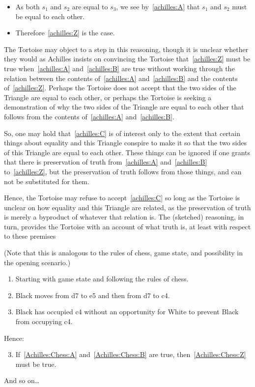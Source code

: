 \documentclass[10pt]{article}
\begin{document}
\begin{note}
{\begin{itemize}
  \item As both \(s_{1}\) and \(s_{2}\) are equal to \(s_{3}\), we see by~\ref{achilles:A} that \(s_{1}\) and \(s_{2}\) must be equal to each other.
  \item Therefore~\ref{achilles:Z} is the case.
  \end{itemize}
  The Tortoise may object to a step in this reasoning, though it is unclear whether they would as Achilles insists on convincing the Tortoise that~\ref{achilles:Z} must be true when~\ref{achilles:A} and~\ref{achilles:B} are true without working through the relation between the contents of~\ref{achilles:A} and~\ref{achilles:B} and the contents of~\ref{achilles:Z}.
  Perhaps the Tortoise does not accept that the two sides of the Triangle are equal to each other, or perhaps the Tortoise is seeking a demonstration of why the two sides of the Triangle are equal to each other that follows from the contents of~\ref{achilles:A} and~\ref{achilles:B}.

  So, one may hold that~\ref{achilles:C} is of interest only to the extent that certain things about equality and this Triangle conspire to make it so that the two sides of this Triangle are equal to each other.
  These things can be ignored if one grants that there is preservation of truth from~\ref{achilles:A} and~\ref{achilles:B} to~\ref{achilles:Z}, but the preservation of truth follows from those things, and can not be substituted for them.

  Hence, the Tortoise may refuse to accept~\ref{achilles:C} so long as the Tortoise is unclear on how equality and this Triangle are related, as the preservation of truth is merely a byproduct of whatever that relation is.
  The (sketched) reasoning, in turn, provides the Tortoise with an account of what truth is, at least with respect to these premises

  (Note that this is analogous to the rules of chess, game state, and possibility in the opening scenario.)
    {
    \color{red}
    \begin{enumerate}[label=(\emph{\Alph*\('\)}), ref=\emph{\Alph*\('\)}]
    \item\label{Achilles:Chess:A} Starting with game state and following the rules of chess.
    \item\label{Achilles:Chess:B} Black moves from d7 to e5 and then from d7 to c4.
      \setcounter{enumi}{25}
    \item\label{Achilles:Chess:Z} Black has occupied c4 without an opportunity for White to prevent Black from occupying c4.
    \end{enumerate}
    Hence:
    \begin{enumerate}[label=(\emph{\Alph*\('\)}), ref=\emph{\Alph*\('\)}]
      \setcounter{enumi}{2}
      \item\label{Achilles:Chess:C} If~\ref{Achilles:Chess:A} and~\ref{Achilles:Chess:B} are true, then~\ref{Achilles:Chess:Z} must be true.
    \end{enumerate}
    And so on\dots
  }
}


\end{note}
\end{document}
